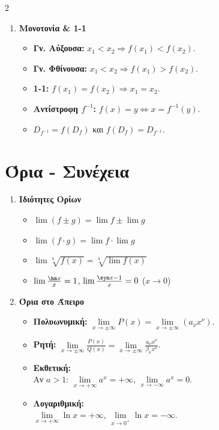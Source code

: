 \documentclass[a4paper,11pt,twoside]{article}
\begin{document}
\begin{multicols}{2}
\begin{enumerate}
    \item \textbf{Μονοτονία \& 1-1}
    \begin{itemize}[leftmargin=0mm]
        \item \textbf{Γν. Αύξουσα:} $x_1 < x_2 \Rightarrow f(x_1) < f(x_2)$.
        \item \textbf{Γν. Φθίνουσα:} $x_1 < x_2 \Rightarrow f(x_1) > f(x_2)$.
        \item \textbf{1-1:} $f(x_1)=f(x_2) \Rightarrow x_1=x_2$.
        \item \textbf{Αντίστροφη $f^{-1}$:} $f(x)=y \Leftrightarrow x=f^{-1}(y)$.
        \item $D_{f^{-1}} = f(D_f)$ και $f(D_f) = D_{f^{-1}}$.
    \end{itemize}
\end{enumerate}

\section{Όρια - Συνέχεια}
\begin{enumerate}
    \item \textbf{Ιδιότητες Ορίων}
    \begin{itemize}[leftmargin=0mm]
        \item $\lim (f \pm g) = \lim f \pm \lim g$
        \item $\lim (f \cdot g) = \lim f \cdot \lim g$
        \item $\lim \sqrt[k]{f(x)} = \sqrt[k]{\lim f(x)}$
        \item $\lim \frac{\hm x}{x} = 1$, \quad $\lim \frac{\syn x - 1}{x} = 0$ ($x \to 0$)
    \end{itemize}

    \item \textbf{Όρια στο Άπειρο}
    \begin{itemize}[leftmargin=0mm]
        \item \textbf{Πολυωνυμική:} $\lim\limits_{x\to \pm\infty} P(x) = \lim\limits_{x\to \pm\infty} (a_\nu x^\nu)$.
        \item \textbf{Ρητή:} $\lim\limits_{x\to \pm\infty} \frac{P(x)}{Q(x)} = \lim\limits_{x\to \pm\infty} \frac{a_\nu x^\nu}{\beta_\kappa x^\kappa}$.
        \item \textbf{Εκθετική:}\\Αν $a>1$: $\lim\limits_{x\to +\infty} a^x = +\infty$, $\lim\limits_{x\to -\infty} a^x = 0$.
        \item \textbf{Λογαριθμική:}\\$\lim\limits_{x\to +\infty} \ln x = +\infty$, $\lim\limits_{x\to 0^+} \ln x = -\infty$.
    \end{itemize}


\end{enumerate}
\end{multicols}
\end{document}
